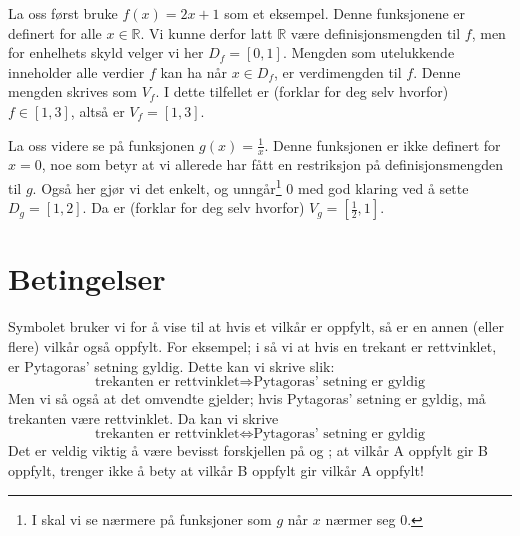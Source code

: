La oss først bruke $ f(x)=2x+1 $ som et eksempel. Denne funksjonene er definert for alle $ x\in \mathbb{R} $. Vi kunne derfor latt $ \mathbb{R} $ være definisjonsmengden til $ f $, men for enhelhets skyld velger vi her $ D_f=[0, 1] $. Mengden som utelukkende inneholder alle verdier $ f $ kan ha når $ x\in D_f $, er verdimengden til $ f $. Denne mengden skrives som $ V_f $. I dette tilfellet er (forklar for deg selv hvorfor) $ f\in [1, 3] $, altså er $ V_f=[1, 3] $.\vsk

La oss videre se på funksjonen $ g(x)=\frac{1}{x} $. Denne funksjonen er ikke definert for $ x=0 $, noe som betyr at vi allerede har fått en restriksjon på definisjonsmengden til $ g $. Også her gjør vi det enkelt, og unngår\footnote{I  skal vi se nærmere på funksjoner som $ g $ når $ x $ nærmer seg 0.} 0 med god klaring ved å sette $ D_g=[1, 2] $. Da er (forklar for deg selv hvorfor) $ V_g=\left[\frac{1}{2}, 1\right] $.\regv
 
\section{Betingelser}
Symbolet \sym{$ \Rightarrow $} bruker vi for å vise til at hvis et vilkår er oppfylt, så er en annen (eller flere) vilkår også oppfylt. For eksempel; i \mb\;så vi at hvis en trekant er rettvinklet, er Pytagoras' setning gyldig. Dette kan vi skrive slik:
\[ \text{trekanten er rettvinklet} \Rightarrow \text{Pytagoras' setning er gyldig}\]
Men vi så også at det omvendte gjelder; hvis Pytagoras' setning er gyldig, må trekanten være rettvinklet. Da kan vi skrive
\[ \text{trekanten er rettvinklet} \iff \text{Pytagoras' setning er gyldig}\]
Det er veldig viktig å være bevisst forskjellen på \sym{$ \Rightarrow $} og \sym{$ \iff $}; at vilkår A oppfylt gir B oppfylt, trenger ikke å bety at vilkår B oppfylt gir vilkår A oppfylt! \regv


